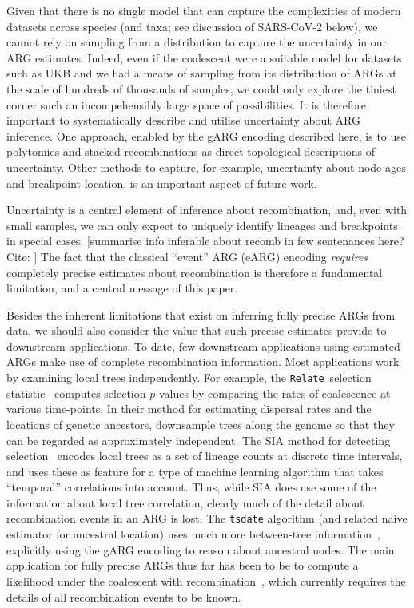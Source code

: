 \documentclass{article}
\newcommand{\relate}[0]{\texttt{Relate}}
\begin{document}
Given that there is no single model that can capture the complexities
of modern datasets across species (and taxa; see discussion of SARS-CoV-2
below), we cannot rely on sampling from a distribution to capture
the uncertainty in our ARG estimates. Indeed, even if the coalescent
were a suitable model for datasets such as UKB and we had a means of
sampling from its distribution of ARGs at the scale of hundreds of thousands
of samples, we could only explore the tiniest corner such an  incompehensibly
large space of possibilities.
It is therefore important to systematically
describe and utilise uncertainty about ARG inference.
One approach, enabled by the gARG encoding described here,
is to use polytomies and stacked recombinations as direct topological
descriptions of uncertainty. Other methods to capture, for example,
uncertainty about node ages and breakpoint location, is an important
aspect of future work.

Uncertainty is a central element of inference about recombination,
and, even with small samples, we can only expect to uniquely identify
lineages and breakpoints in special cases.
[summarise info inferable about recomb in few sentenances here?
Cite: \citep{myers2002detection,hayman2023recoverability}]
The fact that the classical ``event'' ARG (eARG) encoding
\emph{requires} completely precise estimates about recombination
is therefore a fundamental limitation, and a central message
of this paper.

Besides the inherent limitations that exist on inferring fully
precise ARGs from data,
we should also consider the value that such precise estimates provide
to downstream applications.
To date, few downstream applications using estimated ARGs
make use of complete recombination information.
Most applications work by examining local trees independently.
For example, the \relate\ selection statistic~\citep{speidel2019method}
computes selection $p$-values by comparing the rates of coalescence
at various time-points.
In their method
for estimating dispersal rates and the locations of genetic
ancestors,
\citep{osmond2021estimating} downsample trees along the genome
so that they can be regarded as approximately independent.
The SIA method for detecting selection~\citep{hejase2022deep}
encodes local trees as a set of lineage counts at discrete
time intervals, and uses these as feature for a
type of machine learning algorithm
that takes ``temporal'' correlations into account. Thus,
while SIA does use some of the information about local tree correlation,
clearly much of the detail about recombination
events in an ARG is lost.
The \texttt{tsdate} algorithm (and related naive estimator
for ancestral location) uses much more between-tree
information~\citep{wohns2022unified}, explicitly using the gARG
encoding to reason about ancestral nodes.
The main application for fully precise ARGs thus far has been
to be to compute a likelihood under the coalescent with
recombination~\citep[e.g.][]{kuhner2000maximum,mahmoudi2022bayesian},
which currently requires the details of all recombination
events to be known.
\end{document}
